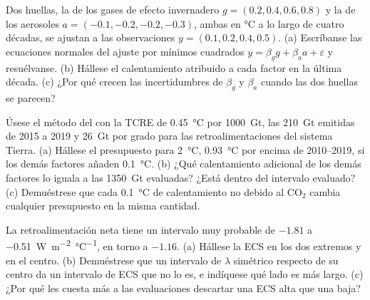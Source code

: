 \begin{exercise}[$\star\star\star$]\label{exo:b2:anthropogenic-climate-change:10}
Dos huellas, la de los gases de efecto invernadero $g = (0.2, 0.4, 0.6, 0.8)$ y la de los aerosoles $a = (-0.1, -0.2,
-0.2, -0.3)$, ambas en \unit{\celsius} a lo largo de cuatro décadas, se ajustan a las observaciones $y = (0.1,
0.2, 0.4, 0.5)$. (a) Escríbanse las ecuaciones normales del ajuste por mínimos cuadrados $y = \beta_g g + \beta_a a
+ \varepsilon$ y resuélvanse. (b) Hállese el calentamiento atribuido a cada factor en la última década.
(c) ¿Por qué crecen las incertidumbres de $\beta_g$ y $\beta_a$ cuando las dos huellas se parecen?
\end{exercise}

\begin{exercise}[$\star\star\star$]\label{exo:b2:anthropogenic-climate-change:11}
Úsese el método del  con la TCRE de \qty{0.45}{\celsius} por
\qty{1000}{Gt}, las \qty{210}{Gt} emitidas de 2015 a 2019 y \qty{26}{Gt} por grado para las
retroalimentaciones del sistema Tierra. (a) Hállese el presupuesto para \qty{2}{\celsius}, \qty{0.93}{\celsius} por encima de
2010--2019, si los demás factores añaden \qty{0.1}{\celsius}. (b) ¿Qué calentamiento adicional de los demás
factores lo iguala a las \qty{1350}{Gt} evaluadas? ¿Está dentro del intervalo evaluado? (c) Demuéstrese
que cada \qty{0.1}{\celsius} de calentamiento no debido al CO$_2$ cambia cualquier presupuesto en la misma cantidad.
\end{exercise}

\begin{exercise}[$\star\star\star$]\label{exo:b2:anthropogenic-climate-change:12}
La retroalimentación neta tiene un intervalo muy probable de $-1.81$ a \qty{-0.51}{W.m^{-2}.\celsius^{-1}}, en torno a
$-1.16$. (a) Hállese la ECS en los dos extremos y en el centro. (b) Demuéstrese que un intervalo de $\lambda$
simétrico respecto de su centro da un intervalo de ECS que no lo es, e indíquese qué lado es más largo. (c) ¿Por qué
les cuesta más a las evaluaciones descartar una ECS alta que una baja?
\end{exercise}

